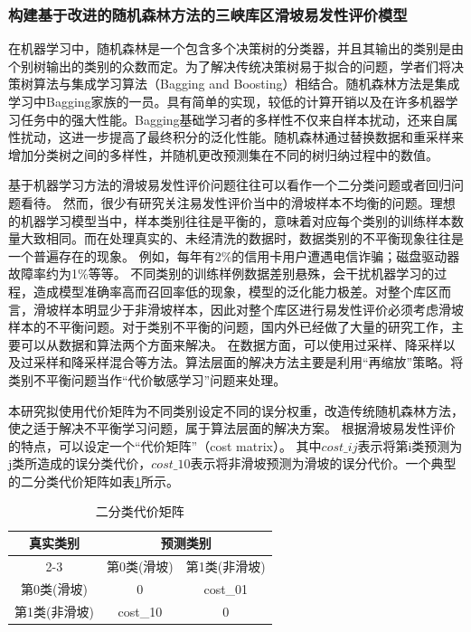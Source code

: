 \documentclass[a4paper,zihao=-4]{article}
\begin{document}
\subsubsection{构建基于改进的随机森林方法的三峡库区滑坡易发性评价模型}

在机器学习中，随机森林是一个包含多个决策树的分类器，并且其输出的类别是由个别树输出的类别的众数而定。为了解决传统决策树易于拟合的问题，学者们将决策树算法与集成学习算法（Bagging and Boosting）相结合。随机森林方法是集成学习中Bagging家族的一员。具有简单的实现，较低的计算开销以及在许多机器学习任务中的强大性能。Bagging基础学习者的多样性不仅来自样本扰动，还来自属性扰动，这进一步提高了最终积分的泛化性能。随机森林通过替换数据和重采样来增加分类树之间的多样性，并随机更改预测集在不同的树归纳过程中的数值。

基于机器学习方法的滑坡易发性评价问题往往可以看作一个二分类问题或者回归问题看待。
然而，很少有研究关注易发性评价当中的滑坡样本不均衡的问题。理想的机器学习模型当中，样本类别往往是平衡的，意味着对应每个类别的训练样本数量大致相同。而在处理真实的、未经清洗的数据时，数据类别的不平衡现象往往是一个普遍存在的现象。
例如，每年有2\%的信用卡用户遭遇电信诈骗；磁盘驱动器故障率约为1\%等等。
不同类别的训练样例数据差别悬殊，会干扰机器学习的过程，造成模型准确率高而召回率低的现象，模型的泛化能力极差。对整个库区而言，滑坡样本明显少于非滑坡样本，因此对整个库区进行易发性评价必须考虑滑坡样本的不平衡问题。对于类别不平衡的问题，国内外已经做了大量的研究工作，主要可以从数据和算法两个方面来解决。
在数据方面，可以使用过采样、降采样以及过采样和降采样混合等方法。算法层面的解决方法主要是利用“再缩放”策略。将类别不平衡问题当作“代价敏感学习”问题来处理。

本研究拟使用代价矩阵为不同类别设定不同的误分权重，改造传统随机森林方法，使之适于解决不平衡学习问题，属于算法层面的解决方案。
根据滑坡易发性评价的特点，可以设定一个“代价矩阵”（cost matrix）。
其中$cost\_ij$表示将第i类预测为j类所造成的误分类代价，$cost\_10$表示将非滑坡预测为滑坡的误分代价。一个典型的二分类代价矩阵如表\ref{tab_costMatrix}所示。

\begin{table}[htb!]
	\centering
	\caption{二分类代价矩阵}
	  \begin{tabular}{c|p{6.625em}|c}
	  \toprule
	  \multirow{2}[4]{*}{真实类别} & \multicolumn{2}{c}{预测类别} \\
  \cmidrule{2-3}          & \multicolumn{1}{c|}{第0类(滑坡)} & 第1类(非滑坡) \\
	  \midrule
	  第0类(滑坡) & \multicolumn{1}{c|}{0} & \multicolumn{1}{c}{cost\_01} \\
	  \midrule
	  第1类(非滑坡) & \multicolumn{1}{c|}{cost\_10} & 0 \\
	  \bottomrule
	  \end{tabular}%
	\label{tab_costMatrix}%
  \end{table}%
  
\end{document}
